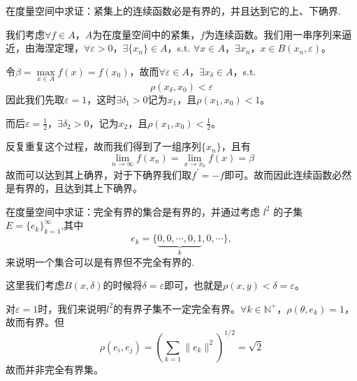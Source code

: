 \begin{exercise}
    在度量空间中求证：紧集上的连续函数必是有界的，并且达到它的上、下确界.
\end{exercise}
\begin{solution}
    我们考虑$\forall f\in A$，$A$为在度量空间中的紧集，$f$为连续函数。我们用一串序列来逼近，由海涅定理，$\forall \varepsilon >0$，$\exists\{x_n\}\in A$，s.t. $\forall x\in A$，$\exists x_n$，$x\in B(x_n, \varepsilon)$。

    令$\beta = \max\limits_{x\in A} f(x) = f(x_0)$，故而$\forall \varepsilon \in A$，$\exists x_{\delta}\in A$，s.t.
    \begin{equation}
        \rho(x_{\delta}, x_0) < \varepsilon \nonumber
    \end{equation}
    因此我们先取$\varepsilon = 1$，这时$\exists \delta_1 >0 $记为$x_1$，且$\rho(x_1, x_0) < 1$。

    而后$\varepsilon = \frac{1}{2}$，$\exists \delta_2 > 0$，记为$x_2$，且$\rho(x_1, x_0)< \frac{1}{2}$。

    反复重复这个过程，故而我们得到了一组序列$\{x_n\}$，且有
    \begin{equation}
        \lim\limits_{n\to \infty} f(x_n)= \lim\limits_{x\to x_0} f(x) = \beta \nonumber
    \end{equation}
    故而可以达到其上确界，对于下确界我们取$f^{\prime} = -f$即可。故而因此连续函数必然是有界的，且达到其上下确界。
\end{solution}

\begin{exercise}
    在度量空间中求证：完全有界的集合是有界的，并通过考虑 $l^2$ 的子集 $E=\{e_k\}_{k=1}^\infty$,其中
    \begin{equation}
        e_k=\{\underbrace{0,0,\cdots,0,1}_k,0,\cdots\},\nonumber
    \end{equation}
    来说明一个集合可以是有界但不完全有界的.
\end{exercise}
\begin{solution}
    这里我们考虑$B(x, \delta)$的时候将$\delta = \varepsilon$即可，也就是$\rho(x, y) < \delta = \varepsilon$。

    对$\varepsilon = 1$时，我们来说明$l^2$的有界子集不一定完全有界。$\forall k\in \mathbb{N}^+$，$\rho(\theta, e_k) = 1$，故而有界。但
    \begin{equation}
        \rho(e_i, e_j) = \left( \sum\limits_{k=1} \|e_k\|^2\right)^{1/2} =\sqrt{2}\nonumber
    \end{equation}
    故而并非完全有界集。
\end{solution}

